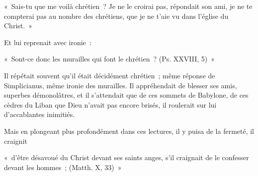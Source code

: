 \documentclass[french,twoside]{book} %
\newenvironment{quoteblock}%
  {\begin{quoting}}
  {\end{quoting}}
\newenvironment{quotebar}{%
    \def\FrameCommand{{\color{rubric!10!}\vrule width 0.5em} \hspace{0.9em}}%
    \def\OuterFrameSep{\itemsep} %
    \MakeFramed {\advance\hsize-\width \FrameRestore}
  }%
  {%
    \endMakeFramed
  }
\renewenvironment{quoteblock}%
  {%
    \savenotes
    \setstretch{0.9}
    \normalfont
    \begin{quotebar}
  }
  {%
    \end{quotebar}
    \spewnotes
  }
\begin{document}
\begin{quoteblock}
\noindent « Sais-tu que me voilà chrétien ? Je ne le croirai pas, répondait son ami, je ne te compterai pas au nombre des chrétiens, que je ne t’aie vu dans l’église du Christ. »\end{quoteblock}

\noindent Et lui reprenait avec ironie :\par

\begin{quoteblock}
\noindent « Sont-ce donc les murailles qui font le chrétien ? (Ps. XXVIII, 5) »\end{quoteblock}

\noindent Il répétait souvent qu’il était décidément chrétien ; même réponse de Simplicianus, même ironie des murailles. Il appréhendait de blesser ses amis, superbes démonolâtres, et il s’attendait que de ces sommets de Babylone, de ces cèdres du Liban que Dieu n’avait pas encore brisés, il roulerait sur lui d’accablantes inimitiés.\par
Mais en plongeant plus profondément dans ces lectures, il y puisa de la fermeté, il craignit\par

\begin{quoteblock}
\noindent « d’être désavoué du Christ devant ses saints anges, s’il craignait de le confesser devant les hommes ; (Matth. X, 33) »\end{quoteblock}
\end{document}

